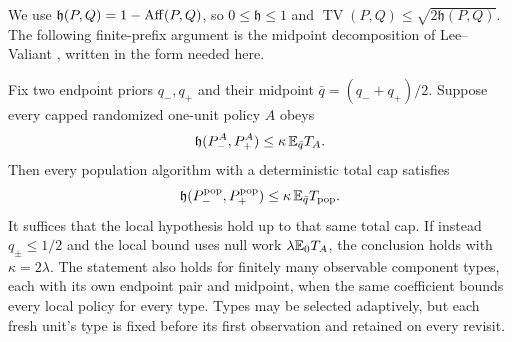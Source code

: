 We use $\mathfrak h(P,Q)=1-\operatorname{Aff}(P,Q)$, so $0\le\mathfrak h\le1$ and
$\operatorname{TV}(P,Q)\le\sqrt{2\mathfrak h(P,Q)}$.
The following finite-prefix argument is the midpoint decomposition of
Lee--Valiant \cite[Lemmas 17--18]{leevaliant}, written in the form needed here.

\begin{lemma}\label{lem:tf-midpoint}
Fix two endpoint priors $q_-,q_+$ and their midpoint
$\bar q=(q_-+q_+)/2$. Suppose every capped randomized one-unit policy
$A$ obeys
\[
 \mathfrak h(P_-^A,P_+^A)\le\kappa\,\mathbb E_{\bar q}T_A.
\]
Then every population algorithm with a deterministic total cap satisfies
\[
 \mathfrak h(P_-^{\rm pop},P_+^{\rm pop})
 \le\kappa\,\mathbb E_{\bar q}T_{\rm pop}.
\]
It suffices that the local hypothesis hold up to that same total cap.
If instead $q_\pm\le1/2$ and the local bound uses null work
$\lambda\mathbb E_0T_A$, the conclusion holds with $\kappa=2\lambda$.
The statement also holds for finitely many observable component types,
each with its own endpoint pair and midpoint, when the same coefficient
bounds every local policy for every type. Types may be selected adaptively, but each fresh unit's type is fixed
before its first observation and retained on every revisit.
\end{lemma}

